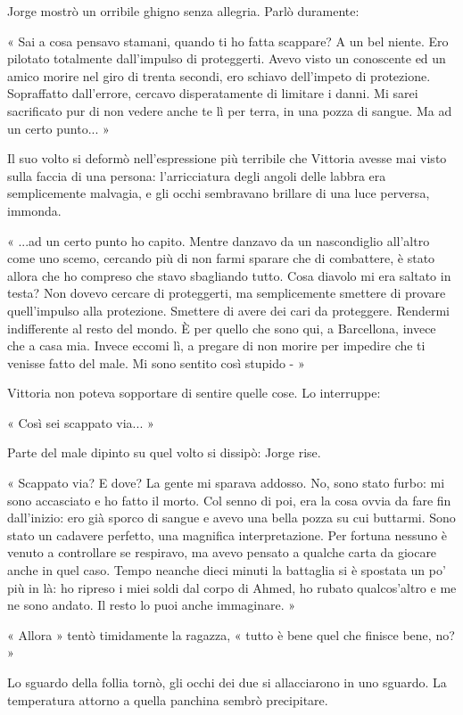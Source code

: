 Jorge mostrò un orribile ghigno senza allegria. Parlò duramente:

« Sai a cosa pensavo stamani, quando ti ho fatta scappare? A un bel niente. Ero pilotato totalmente dall'impulso di proteggerti. Avevo visto un conoscente ed un amico morire nel giro di trenta secondi, ero schiavo dell'impeto di protezione. Sopraffatto dall'errore, cercavo disperatamente di limitare i danni. Mi sarei sacrificato pur di non vedere anche te lì per terra, in una pozza di sangue. Ma ad un certo punto... »

Il suo volto si deformò nell'espressione più terribile che Vittoria avesse mai visto sulla faccia di una persona: l'arricciatura degli angoli delle labbra era semplicemente malvagia, e gli occhi sembravano brillare di una luce perversa, immonda.

« ...ad un certo punto ho capito. Mentre danzavo da un nascondiglio all'altro come uno scemo, cercando più di non farmi sparare che di combattere, è stato allora che ho compreso che stavo sbagliando tutto. Cosa diavolo mi era saltato in testa? Non dovevo cercare di proteggerti, ma semplicemente smettere di provare quell'impulso alla protezione. Smettere di avere dei cari da proteggere. Rendermi indifferente al resto del mondo. È per quello che sono qui, a Barcellona, invece che a casa mia. Invece eccomi lì, a pregare di non morire per impedire che ti venisse fatto del male. Mi sono sentito così stupido - »

Vittoria non poteva sopportare di sentire quelle cose. Lo interruppe:

« Così sei scappato via... »

Parte del male dipinto su quel volto si dissipò: Jorge rise.

« Scappato via? E dove? La gente mi sparava addosso. No, sono stato furbo: mi sono accasciato e ho fatto il morto. Col senno di poi, era la cosa ovvia da fare fin dall'inizio: ero già sporco di sangue e avevo una bella pozza su cui buttarmi. Sono stato un cadavere perfetto, una magnifica interpretazione. Per fortuna nessuno è venuto a controllare se respiravo, ma avevo pensato a qualche carta da giocare anche in quel caso. Tempo neanche dieci minuti la battaglia si è spostata un po' più in là: ho ripreso i miei soldi dal corpo di Ahmed, ho rubato qualcos'altro e me ne sono andato. Il resto lo puoi anche immaginare. »

« Allora » tentò timidamente la ragazza, « tutto è bene quel che finisce bene, no? »

Lo sguardo della follia tornò, gli occhi dei due si allacciarono in uno sguardo. La temperatura attorno a quella panchina sembrò precipitare.

